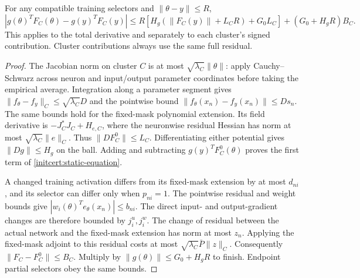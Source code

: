 \begin{proposition}\label{initcert:static-bound}
For any compatible training selectors and $\|\theta-y\|\le R$,
\begin{equation}\label{initcert:static-equation}
 \left|g(\theta)^TF_C(\theta)-g(y)^TF_C(y)\right|
 \le R\left[H_g(\|F_C(y)\|+L_CR)+G_0L_C\right]
                   +(G_0+H_gR)B_C.
\end{equation}
This applies to the total derivative and separately to each cluster's
signed contribution. Cluster contributions always use the same full residual.
\end{proposition}
\begin{proof}
The Jacobian norm on cluster $C$ is at most
$\sqrt{\lambda_C}\|\theta\|$: apply Cauchy--Schwarz across neuron and
input/output parameter coordinates before taking the empirical average.
Integration along a parameter segment gives
$\|f_\theta-f_y\|_C\le\sqrt{\lambda_C}D$ and the pointwise bound
$\|f_\theta(x_n)-f_y(x_n)\|\le Ds_n$.
The same bounds hold for the fixed-mask polynomial extension.
Its field derivative is $-J_C^*J_C+H_{e,C}$, where the neuronwise
residual Hessian has norm at most
$\sqrt{\lambda_C}\|e\|_C$. Thus
$\|DF_C^0\|\le L_C$. Differentiating either potential gives
$\|Dg\|\le H_g$ on the ball. Adding and subtracting
$g(y)^TF_C^0(\theta)$ proves the first term of \eqref{initcert:static-equation}.

A changed training activation differs from its fixed-mask extension by at
most $d_{ni}$, and its selector can differ only when $p_{ni}=1$.
The pointwise residual and weight bounds give
$|w_i(\theta)^Te_\theta(x_n)|\le b_{ni}$. The direct input- and
output-gradient changes are therefore bounded by $j_i^u,j_i^w$.
The change of residual between the actual network and the fixed-mask
extension has norm at most $z_n$. Applying the fixed-mask adjoint to
this residual costs at most $\sqrt{\lambda_C}\bar P\|z\|_C$.
Consequently $\|F_C-F_C^0\|\le B_C$. Multiply by
$\|g(\theta)\|\le G_0+H_gR$ to finish. Endpoint partial selectors obey
the same bounds.
\end{proof}

